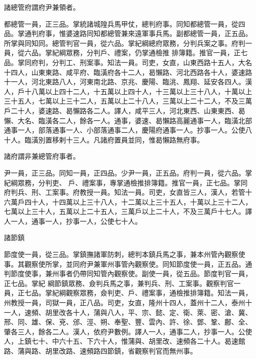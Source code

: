 \begin{pinyinscope}
 諸總管府謂府尹兼領者。



 都總管一員，正三品。掌統諸城隍兵馬甲仗，總判府事。同知都總管一員，從四品。掌通判府事，惟婆速路同知都總管兼來遠軍事兵馬。副都總管一員，正五品。所掌與同知同。總管判官一員，從六品。掌紀綱總府眾務，分判兵案之事。府判一員，從六品。掌紀綱眾務，分判戶、禮案，仍掌通檢推
 排簿籍。推官一員，正七品。掌同府判，分判工、刑案事。知法一員。司吏，女直，山東西路十五人，大名十四人，山東東路、咸平府、臨潢府各十二人，曷懶路、河北西路各十人，婆速路十一人，河北東路八人，河東南北路、京兆、慶陽、臨洮、鳳翔、延安各四人。漢人，戶十八萬以上四十二人，十五萬以上四十人，十三萬以上三十八人，十萬以上三十五人，七萬以上三十二人，五萬以上二十八人，三萬以上二十二人，不及三萬戶二十人，婆速路、曷懶路各二人。譯人，咸平三人，河北東西、山東東西、曷懶、大名、臨潢各二人，餘各一人。通事，婆速、曷懶路高麗通事一人，臨潢北部通事一人，部落通事一人、小部落通事二人，慶陽府通事一人。抄事一人。公使八十人。臨潢別置移剌十三人。凡諸府置員並同，惟曷懶路無府事。



 諸府謂非兼總管府事者。



 尹一員，正三品。同知一員，正四品。少尹一員，正五品。府判一員，從六品。掌紀綱眾務，分判吏、
 戶、禮案事，專掌通檢推排簿籍。推官一員，正七品。掌同府判兵、刑、工案事。府教授一員。知法一員。司吏，女直皆三人，漢人，若管十六萬戶四十人，十四萬以上三十八人，十二萬以上三十五人，十萬以上三十二人，七萬以上三十人，五萬以上二十五人，三萬戶以上二十人，不及三萬戶十七人。譯人一人，通事一人，抄事一人，公使七十人。



 諸節鎮



 節度使一員，從三品。掌鎮撫諸軍防刺，總判本鎮兵馬之事，兼本州管內觀察使事。其觀察使所掌，並同府尹兼軍州事管內觀察使。同知節度使一員，正五品。通判節度使事，兼州事者仍帶同知管內觀察使。副使一員，從五品。節度判官一員，正七品。掌紀
 綱節鎮眾務、僉判兵馬之事，兼判兵、刑、工案事。觀察判官一員，正七品。掌紀綱觀察眾務，僉判吏、戶、禮案事，通檢推排簿籍。知法一員，州教授一員，司獄一員，正八品。司吏，女直，隆州十四人，蓋州十二人，泰州十一人，速頻、胡里改各十人，蒲與八人，平、宗、懿、定、衛、萊、密、滄、冀、邢、同、雄、保、兗、邠、涇、朔、奉聖、豐、雲內、許、徐、鄧、鞏、鄜、全、肇各三人，餘各二人。漢人，依府尹數例。譯人一人，通事二人，抄事一人。公使人，上鎮七十、中六十五、下六十人，惟蒲與、胡里改、速頻各二十人。曷速館路、蒲與路、胡里改路、速頻路四節鎮，省觀察判官而無州事。




\end{pinyinscope}
